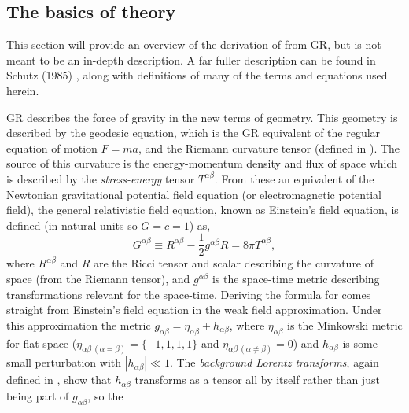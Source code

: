 \subsection{The basics of \gw theory}
This section will provide an overview of the derivation of \gws from GR, but is not meant to be an
in-depth description. A far fuller description can be found in Schutz (1985) \cite{Schutz:1985},
along with definitions of many of the terms and equations used herein.

GR describes the force of gravity in the new terms of geometry. This geometry is described by the
geodesic equation, which is the GR equivalent of the regular equation of motion $F = ma$, and the
Riemann curvature tensor (defined in \cite{Schutz:1985}).
The source of this curvature is the energy-momentum density and flux of space which is described by
the {\it stress-energy} tensor $T^{\alpha\beta}$. From these an equivalent of the Newtonian
gravitational potential field equation (or electromagnetic potential field), the general
relativistic field equation, known as Einstein's field equation, is defined (in natural units so
$G=c=1$) as,
\begin{equation}\label{EinsteinsFieldEqn}
G^{\alpha\beta} \equiv R^{\alpha\beta} - \frac{1}{2}g^{\alpha\beta}R = 8\pi{}T^{\alpha\beta},
\end{equation}
where $R^{\alpha\beta}$ and $R$ are the Ricci tensor and scalar describing the curvature of space
(from the Riemann tensor), and $g^{\alpha\beta}$ is the space-time metric describing transformations
relevant for the space-time. Deriving the formula for \gws comes straight from Einstein's field
equation in the weak field approximation. Under this approximation the metric $g_{\alpha\beta} =
\eta_{\alpha\beta} + h_{\alpha\beta}$, where $\eta_{\alpha\beta}$ is the Minkowski metric for flat
space ($\eta_{\alpha\beta~(\alpha=\beta)} = \{-1,1,1,1\}$ and $\eta_{\alpha\beta~(\alpha\ne \beta)}
 = 0$) and $h_{\alpha\beta}$ is some small perturbation with $|h_{\alpha\beta}| \ll 1$. The {\it
background Lorentz transforms}, again defined in \cite{Schutz:1985}, show that $h_{\alpha\beta}$
transforms as a tensor all by itself rather than just being part of $g_{\alpha\beta}$, so the
